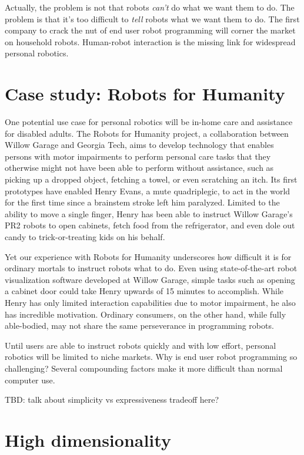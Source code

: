 \documentclass{article}
\begin{document}
Actually, the problem is not that robots {\em can't} do what we want them to do. The problem is that it's too difficult to {\em tell} robots what we want them to do. The first company to crack the nut of end user robot programming will corner the market on household robots. Human-robot interaction is the missing link for widespread personal robotics.

\section{Case study: Robots for Humanity}

One potential use case for personal robotics will be in-home care and assistance for disabled adults. The Robots for Humanity project, a collaboration between Willow Garage and Georgia Tech, aims to develop technology that enables persons with motor impairments to perform personal care tasks that they otherwise might not have been able to perform without assistance, such as picking up a dropped object, fetching a towel, or even scratching an itch. Its first prototypes have enabled Henry Evans, a mute quadriplegic, to act in the world for the first time since a brainstem stroke left him paralyzed. Limited to the ability to move a single finger, Henry has been able to instruct Willow Garage's PR2 robots to open cabinets, fetch food from the refrigerator, and even dole out candy to trick-or-treating kids on his behalf.

Yet our experience with Robots for Humanity underscores how difficult it is for ordinary mortals to instruct robots what to do. Even using state-of-the-art robot visualization software developed at Willow Garage, simple tasks such as opening a cabinet door could take Henry upwards of 15 minutes to accomplish.  While Henry has only limited interaction capabilities due to motor impairment, he also has incredible motivation. Ordinary consumers, on the other hand, while fully able-bodied, may not share the same perseverance in programming robots.

Until users are able to instruct robots quickly and with low effort, personal robotics will be limited to niche markets.  Why is end user robot programming so challenging? Several compounding factors make it more difficult than normal computer use.

TBD: talk about simplicity vs expressiveness tradeoff here?

\section{High dimensionality}
\end{document}
